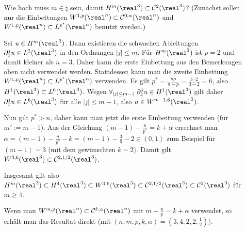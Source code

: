 \begin{Bsp}
    Wie hoch muss $m \in \natural$ sein, damit $H^m(\real^3) \subset \C^2(\real^3)$?
    (Zunächst sollen nur die Einbettungen $W^{1,p}(\real^n) \subset \C^{0,\alpha}(\real^n)$ und
    $W^{1,p}(\real^n) \subset L^{p^\ast}(\real^n)$ benutzt werden.)
    
    Sei $u \in H^m(\real^3)$.
    Dann existieren die schwachen Ableitungen $\partial_x^j u \in L^2(\real^3)$ in den Ordnungen
    $|j| \le m$.
    Für $H^m(\real^3)$ ist $p = 2$ und damit kleiner als $n = 3$.
    Daher kann die erste Einbettung aus den Bemerkungen oben nicht verwendet werden.
    Stattdessen kann man die zweite Einbettung $W^{1,p}(\real^n) \subset L^{p^\ast}(\real^n)$
    verwenden.
    Es gilt $p^\ast = \frac{np}{n - p} = \frac{3 \cdot 2}{3 - 2} = 6$,
    also $H^1(\real^3) \subset L^6(\real^3)$.
    Wegen $\forall_{|j| \le m-1}\; \partial_x^j u \in H^1(\real^3)$ gilt daher
    $\partial_x^j u \in L^6(\real^3)$ für alle $|j| \le m - 1$,
    also $u \in W^{m-1,6}(\real^3)$.
    
    Nun gilt $p^\ast > n$, daher kann man jetzt die erste Einbettung verwenden
    (für $m' := m - 1$).
    Aus der Gleichung $(m-1) - \frac{n}{p^\ast} = k + \alpha$ errechnet man
    $\alpha = (m-1) - \frac{n}{p^\ast} - k = (m-1) - \frac{3}{6} - 2 \in (0, 1)$
    zum Beispiel für $(m-1) = 3$ (mit dem gewünschten $k = 2$).
    Damit gilt $W^{3,6}(\real^3) \subset \C^{2,1/2}(\real^3)$.
    
    Insgesamt gilt also
    $H^m(\real^3) \subset H^4(\real^3) \subset W^{3,6}(\real^3) \subset \C^{2,1/2}(\real^3)
    \subset \C^2(\real^3)$ für $m \ge 4$.
    
    Wenn man $W^{m,p}(\real^n) \subset \C^{k,\alpha}(\real^n)$ mit $m - \frac{n}{p} = k + \alpha$
    verwendet, so erhält man das Resultat direkt
    (mit $(n, m, p, k, \alpha) = (3, 4, 2, 2, \frac{1}{2})$).
\end{Bsp}

\linie

